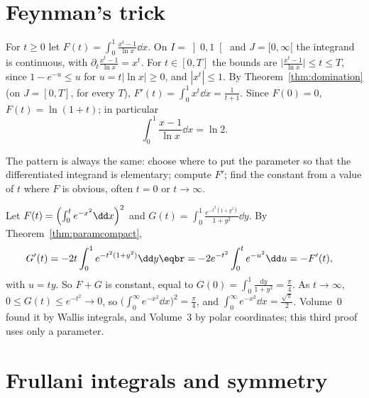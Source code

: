 \section{Feynman's trick}

\begin{example}\label{ex:logint}
For $t\ge0$ let $F(t)=\int_0^1\frac{x^t-1}{\ln x}\dd x$. On $I=\left]0,1\right[$ and $J=[0,\infty[$ the integrand is continuous, with
$\partial_t\frac{x^t-1}{\ln x}=x^t$. For $t\in[0,T]$ the bounds are $\bigl|\frac{x^t-1}{\ln x}\bigr|\le t\le T$, since $1-e^{-u}\le u$ for
$u=t|\ln x|\ge0$, and $|x^t|\le1$. By Theorem~\ref{thm:domination} (on $J=[0,T]$, for every $T$), $F'(t)=\int_0^1x^t\dd x=\frac1{t+1}$. Since
$F(0)=0$, $F(t)=\ln(1+t)$; in particular
\[
\int_0^1\frac{x-1}{\ln x}\dd x=\ln2.
\]
\end{example}

The pattern is always the same: choose where to put the parameter so that the differentiated integrand is elementary;
compute $F'$; find the constant from a value of $t$ where $F$ is obvious, often $t=0$ or $t\to\infty$.

\begin{example}\label{ex:gaussfeynman}
Let $F(t)=\Bigl(\int_0^te^{-x^2}\dd x\Bigr)^2$ and $G(t)=\int_0^1\frac{e^{-t^2(1+y^2)}}{1+y^2}\dd y$. By Theorem~\ref{thm:paramcompact},
\[
\begin{aligned}G'(t)&=-2t\int_0^1e^{-t^2(1+y^2)}\dd y\eqbr=-2e^{-t^2}\int_0^te^{-u^2}\dd u=-F'(t),\end{aligned}
\]
with $u=ty$. So $F+G$ is constant, equal to $G(0)=\int_0^1\frac{\mathrm dy}{1+y^2}=\frac\pi4$. As $t\to\infty$, $0\le G(t)\le e^{-t^2}\to0$, so
$\bigl(\int_0^\infty e^{-x^2}\dd x\bigr)^2=\frac\pi4$, and $\int_0^\infty e^{-x^2}\dd x=\frac{\sqrt\pi}2$. Volume~0 found it by Wallis integrals, and Volume~3
by polar coordinates; this third proof uses only a parameter.
\end{example}

\section{Frullani integrals and symmetry}


